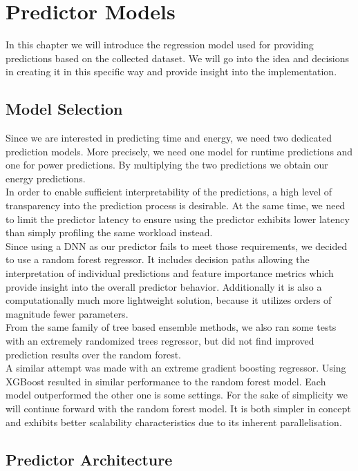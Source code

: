 \chapter{Predictor Models}\label{chap:contrib2}

In this chapter we will introduce the regression model used for providing predictions based on the collected dataset. We will go into the idea and decisions in creating it in this specific way and provide insight into the implementation.


\section{Model Selection}
Since we are interested in predicting time and energy, we need two dedicated prediction models. More precisely, we need one model for runtime predictions and one for power predictions. By multiplying the two predictions we obtain our energy predictions. \\
In order to enable sufficient interpretability of the predictions, a high level of transparency into the prediction process is desirable. At the same time, we need to limit the predictor latency to ensure using the predictor exhibits lower latency than simply profiling the same workload instead. \\
Since using a DNN as our predictor fails to meet those requirements, we decided to use a random forest regressor. It includes decision paths allowing the interpretation of individual predictions and feature importance metrics which provide insight into the overall predictor behavior. Additionally it is also a computationally much more lightweight solution, because it utilizes orders of magnitude fewer parameters. \\
From the same family of tree based ensemble methods, we also ran some tests with an extremely randomized trees regressor, but did not find improved prediction results over the random forest. \\
A similar attempt was made with an extreme gradient boosting regressor. Using XGBoost resulted in similar performance to the random forest model. Each model outperformed the other one is some settings. For the sake of simplicity we will continue forward with the random forest model. It is both simpler in concept and exhibits better scalability characteristics due to its inherent parallelisation.



\section{Predictor Architecture}

